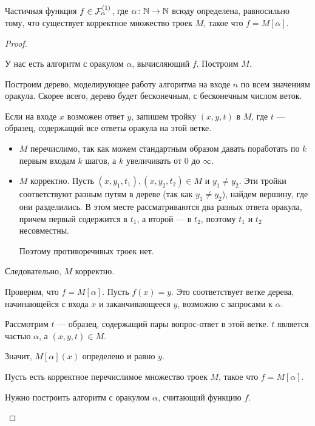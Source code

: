\begin{thm}\label{thm:malp}
	Частичная функция $ f \in \mathcal{F}^{(1)}_{ \alpha }$, где $  \alpha \colon \mathbb{N} \to  \mathbb{N}$ всюду определена, равносильно тому, что существует корректное множество троек $ M$, такое что  $ f = M[ \alpha ]$.
\end{thm}
\begin{proof}
~\begin{description}
	\item[] У нас есть алгоритм с оракулом $  \alpha $, вычисляющий $ f$. Построим $ M$.

		   Построим  дерево, моделирующее работу алгоритма на входе $ n$ по всем значениям оракула. Скорее всего, дерево будет бесконечным, с бесконечным числом веток.

		   Если на входе $ x$ возможен ответ $ y$, запишем тройку  $ (x, y, t)$ в  $ M$, где  $ t$ --- образец, содержащий все  ответы оракула на этой ветке.
		   \begin{itemize}
			   \item $ M$ перечислимо, так как можем стандартным образом давать поработать по $ k$ первым входам  $ k$ шагов, а  $ k$ увеличивать от  $ 0$ до  $  \infty$.
			   \item $ M$ корректно. Пусть  $ (x, y_1, t_1), (x, y_2, t_2) \in M$ и $  y_1 \ne y_2$. Эти тройки соответствуют разным путям в дереве (так как $  y_1 \ne y_2$), найдем вершину, где они разделились. В этом месте рассматриваются два разных ответа оракула, причем первый содержится в $  t_1$, а второй --- в $  t_2$, поэтому $  t_1$ и $  t_2$ несовместны.

				   Поэтому противоречивых троек нет.
		   \end{itemize}
		   Следовательно, $ M$ корректно.
	   \item Проверим, что $ f = M[ \alpha ]$. Пусть $ f(x) = y$. Это соответствует ветке дерева, начинающейся с входа $ x$ и заканчивающееся   $ y$, возможно с запросами к $  \alpha $.

		   Рассмотрим $ t$ --- образец, содержащий пары вопрос-ответ в этой ветке. $ t$ является частью  $ \alpha $, а $ (x, y, t) \in M$.

		   Значит, $ M[ \alpha ](x) $ определено и равно $ y$.
	   \item[\boxed{ 2 \Longrightarrow 1}] 
		   Пусть есть корректное перечислимое множество троек $ M$, такое  что $ f = M[ \alpha ]$.

		   Нужно построить алгоритм с оракулом $ \alpha $, считающий функцию $ f$.


\end{description}
\end{proof}
